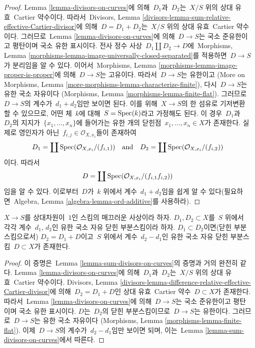 \begin{proof}
Lemma \ref{lemma-divisors-on-curves}에 의해\  $D_1$과\  $D_2$는\ 
$X/S$ 위의 상대 유효\  Cartier 약수이다. 따라서\ 
Divisors, Lemma \ref{divisors-lemma-sum-relative-effective-Cartier-divisor}에
의해\  $D = D_1 + D_2$는\  $X/S$ 위의 상대 유효\  Cartier 약수이다.
그러므로\  Lemma \ref{lemma-divisors-on-curves}에 의해\  $D \to S$는 국소
준유한이고 평탄이며 국소 유한 표시이다. 전사 정수 사상\ 
$D_1 \amalg D_2 \to D$에\  Morphisms, Lemma
\ref{morphisms-lemma-image-universally-closed-separated}를 적용하면\ 
$D \to S$가 분리임을 알 수 있다. 이어서\  Morphisms, Lemma
\ref{morphisms-lemma-image-proper-is-proper}에 의해\  $D \to S$는 고유이다.
따라서\  $D \to S$는 유한이고
(More on Morphisms, Lemma \ref{more-morphisms-lemma-characterize-finite}),
다시\  $D \to S$는 유한 국소 자유이다
(Morphisms, Lemma \ref{morphisms-lemma-finite-flat}).
그러므로\  $D \to S$의 계수가\  $d_1 + d_2$임만 보이면 된다.
이를 위해\  $X \to S$의 한 섬유로 기저변환할 수 있으므로, 어떤 체\  $k$에
대해\  $S = \mathop{\mathrm{Spec}}(k)$라고 가정해도 된다. 이 경우\  $D_1$과\  $D_2$의 지지가\ 
$\{x_1, \ldots, x_n\}$에 들어가는 유한 개의 닫힌점\ 
$x_1, \ldots, x_n \in X$가 존재한다. 실제로 영인자가 아닌\ 
$f_{i, j} \in \mathcal{O}_{X, x_i}$들이 존재하여
$$
D_1 = \coprod \mathop{\mathrm{Spec}}(\mathcal{O}_{X, x_i}/(f_{i, 1}))
\quad\text{and}\quad
D_2 = \coprod \mathop{\mathrm{Spec}}(\mathcal{O}_{X, x_i}/(f_{i, 2}))
$$
이다. 따라서
$$
D = \coprod \mathop{\mathrm{Spec}}(\mathcal{O}_{X, x_i}/(f_{i, 1}f_{i, 2}))
$$
임을 알 수 있다. 이로부터\  $D$가\  $k$ 위에서 계수\  $d_1 + d_2$임을 쉽게
알 수 있다(필요하면\  Algebra, Lemma \ref{algebra-lemma-ord-additive}를
사용하라).
\end{proof}

\begin{lemma}
\label{lemma-difference-divisors-on-curves}
$X \to S$를 상대차원이\  $1$인 스킴의 매끄러운 사상이라 하자.
$D_1, D_2 \subset X$를\  $S$ 위에서 각각 계수\  $d_1$, $d_2$인 유한 국소
자유 닫힌 부분스킴이라 하자. $D_1 \subset D_2$이면(닫힌 부분스킴으로서)
$D_2 = D_1 + D$이고\  $S$ 위에서 계수\  $d_2 - d_1$인 유한 국소 자유 닫힌
부분스킴\  $D \subset X$가 존재한다.
\end{lemma}

\begin{proof}
이 증명은\  Lemma \ref{lemma-sum-divisors-on-curves}의 증명과 거의 완전히
같다. Lemma \ref{lemma-divisors-on-curves}에 의해\  $D_1$과\  $D_2$는\ 
$X/S$ 위의 상대 유효\  Cartier 약수이다. Divisors, Lemma
\ref{divisors-lemma-difference-relative-effective-Cartier-divisor}에 의해\ 
$D_2 = D_1 + D$인 상대 유효\  Cartier 약수\  $D \subset X$가 존재한다.
따라서\  Lemma \ref{lemma-divisors-on-curves}에 의해\  $D \to S$는 국소
준유한이고 평탄이며 국소 유한 표시이다. $D$는\  $D_2$의 닫힌 부분스킴이므로\ 
$D \to S$는 유한이다. 그러므로\  $D \to S$는 유한 국소 자유이다
(Morphisms, Lemma \ref{morphisms-lemma-finite-flat}).
이제\  $D \to S$의 계수가\  $d_2 - d_1$임만 보이면 되며, 이는\  Lemma
\ref{lemma-sum-divisors-on-curves}에서 따른다.
\end{proof}

